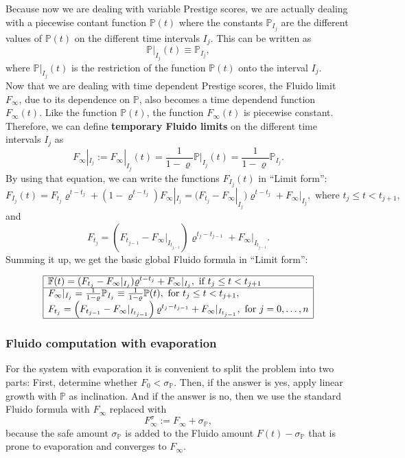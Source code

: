 \documentclass[a4paper,12pt]{scrartcl}
\newcounter{formula}
\begin{document}
Because now we are dealing with variable Prestige scores, we are actually dealing with a piecewise contant function $\mathbb{P}(t)$ where the constants $\mathbb{P}_{I_j}$ are the different values of $\mathbb{P}(t)$ on the different time intervals $I_j$. This can be written as
$$\mathbb{P}|_{I_j}(t) \equiv \mathbb{P}_{I_j},$$
where $\mathbb{P}|_{I_j}(t)$ is the restriction of the function $\mathbb{P}(t)$ onto the interval $I_j$.\\

Now that we are dealing with time dependent Prestige scores, the Fluido limit $F_{\infty}$, due to its dependence on $\mathbb{P}$, also becomes a time dependend function $F_{\infty}(t)$. Like the function $\mathbb{P}(t)$, the function $F_{\infty}(t)$ is piecewise constant. Therefore, we can define \textbf{temporary Fluido limits} on the different time intervals $I_j$ as
$$F_{\infty}|_{I_j} := F_{\infty}|_{I_j}(t) = \frac{1}{1- \varrho} \mathbb{P}|_{I_j}(t) = \frac{1}{1- \varrho} \mathbb{P}_{I_j}.$$
By using that equation, we can write the functions $F_{I_j}(t)$ in ``Limit form'':
$$F_{I_j}(t) = F_{t_j} \varrho^{t-t_j} + (1- \varrho^{t-t_j}) F_{\infty}|_{I_j} = (F_{t_j} - F_{\infty}|_{I_j}) \varrho^{t-t_j} + F_{\infty}|_{I_j}, \mbox{ where } t_j \leq t < t_{j+1},$$
and
$$F_{t_j} = \left(F_{t_{j-1}} - F_{\infty}|_{I_{t_{j-1}}}\right) \varrho^{t_j-t_{j-1}} + F_{\infty}|_{I_{t_{j-1}}}.$$
Summing it up, we get the basic global Fluido formula in ``Limit form'':

$$
\begin{array}{|l|}
\hline
\mathbb{F}(t) = (F_{t_j} - F_{\infty}|_{I_j}) \varrho^{t-t_j} + F_{\infty}|_{I_j}, \mbox{ if } t_j \leq t < t_{j+1}\\
\hline
F_{\infty}|_{I_j} = \frac{1}{1- \varrho} \mathbb{P}_{I_j} \equiv \frac{1}{1- \varrho} \mathbb{P}(t), \mbox{ for } t_j \leq t < t_{j+1},\\
F_{t_j} = \left(F_{t_{j-1}} - F_{\infty}|_{I_{t_{j-1}}}\right) \varrho^{t_j-t_{j-1}} + F_{\infty}|_{I_{t_{j-1}}}, \mbox{ for } j=0, \ldots, n\\
\hline
\end{array}$$


\subsubsection{Fluido computation with evaporation}
For the system with evaporation it is convenient to split the problem into two parts: First, determine whether $F_0 < \sigma_{\mathbb{P}}$. Then, if the answer is yes, apply linear growth with $\mathbb{P}$ as inclination. And if the answer is no, then we use the standard Fluido formula with $F_{\infty}$ replaced with
$$F^{\sigma}_{\infty} := F_{\infty} + \sigma_{\mathbb{P}},$$
because the safe amount $\sigma_{\mathbb{P}}$ is added to the Fluido amount $F(t) - \sigma_{\mathbb{P}}$ that is prone to evaporation and converges to $F_{\infty}$.
\end{document}
